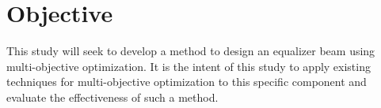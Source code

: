 \section{Objective}
This study will seek to develop a method to design an equalizer beam using multi-objective optimization. It is the intent of this study to apply existing techniques for multi-objective optimization to this specific component and evaluate the effectiveness of such a method. 
